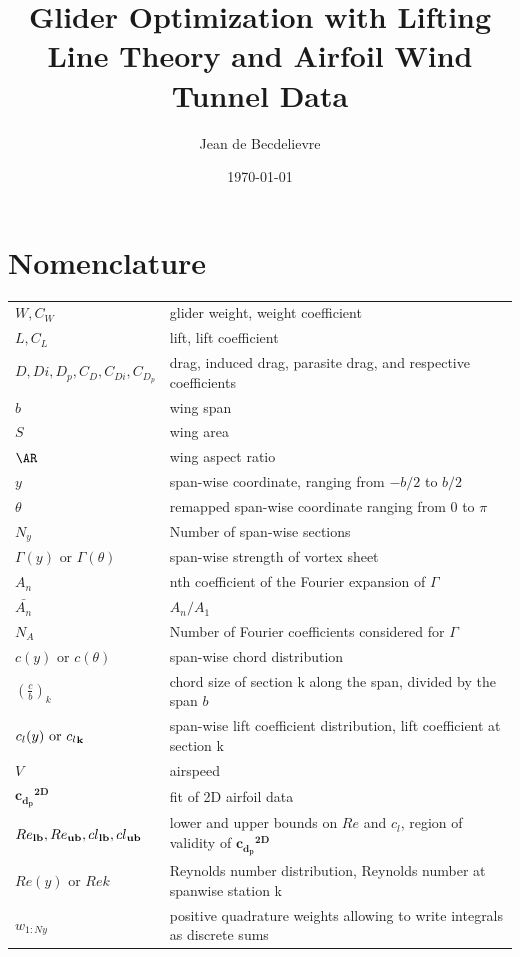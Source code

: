 \documentclass[letterpaper,12pt]{article}
\begin{document}
\newcommand{\cldat}{\boldsymbol{{c_l}^{2D}}}
\newcommand{\CDp}{C_{D_p}}
\newcommand{\CDi}{C_{D_i}}
\newcommand{\cl}[1]{{c_l}_{\bf #1}}
\newcommand{\cdp}[1]{{c_{d_p}}_{\bf #1}}
\newcommand{\cb}[1]{\left(
	\frac c b 
\right)_{#1}
}
\newcommand{\An}[1]{\bar{A_{#1}}}
\newcommand{\cddat}{\boldsymbol{{c_{d_p}}^{2D}}}


\title{Glider Optimization with Lifting Line Theory and Airfoil Wind Tunnel Data}
\author{Jean de Becdelievre}
\date{\today}
\maketitle

\section{Nomenclature}

{\renewcommand\arraystretch{1.0}
\noindent\begin{longtable}{@{}l @{\quad : \quad} l@{}}
$W, C_W$  & glider weight, weight coefficient \\
$L, C_L$ & lift, lift coefficient \\
$D,Di,D_p, C_D,C_{Di},C_{D_p}$& drag, induced drag, parasite drag, and respective coefficients \\
$b$ & wing span \\
$S$ & wing area \\
$\AR$ & wing aspect ratio \\
$y$ & span-wise coordinate, ranging from $-b/2$ to $b/2$ \\
$\theta$ & remapped span-wise coordinate ranging from $0$ to $\pi$ \\
$N_{y}$ & Number of span-wise sections \\
$\Gamma(y) \text{ or } \Gamma(\theta)$ & span-wise strength of vortex sheet\\
$A_n$ & nth coefficient of the Fourier expansion of $\Gamma$ \\
$\An{n}$ &  $A_n / A_1$\\
$N_{A}$ & Number of Fourier coefficients considered for $\Gamma$ \\
$c(y) \text{ or } c(\theta)$ & span-wise chord distribution\\
$\cb{k} $ &  chord size of section k along the span, divided by the span $b$\\
$c_l(y) \text{ or } \cl{k}$ & span-wise lift coefficient distribution, lift coefficient at section k\\
$V$ & airspeed \\
$\cddat $ & fit of 2D airfoil data \\
${Re}_{\bf lb}, {Re}_{\bf ub}, {cl}_{\bf lb}, {cl}_{\bf ub}$ & lower and upper bounds on $Re$ and $c_l$, region of validity of  $\cddat$ \\
$Re(y) \text{ or } Re{k}$ & Reynolds number distribution, Reynolds number at spanwise station k \\
$w_{1:Ny}$ & positive quadrature weights allowing to write integrals as discrete sums 
\end{longtable}}
\end{document}
